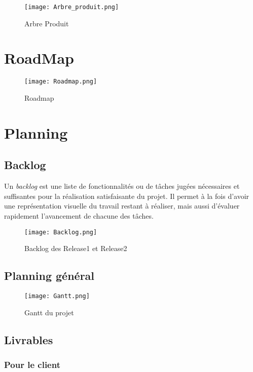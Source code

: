 \documentclass[10pt,a4paper]{article}
\begin{document}
\begin{figure}[!h]
  \centering
  \noindent\centerline{\texttt{[image: Arbre\_produit.png]}}
  \caption{Arbre Produit}
\end{figure}

\newpage
\section{RoadMap}

\begin{figure}[!h]
  \noindent\centerline{\texttt{[image: Roadmap.png]}}
  \caption{Roadmap}
\end{figure}

\newpage
\section{Planning}
\label{sec:planning}

\subsection{Backlog}

Un \textit{backlog} est une liste de fonctionnalités ou de tâches jugées nécessaires et suffisantes pour la réalisation satisfaisante du projet.
Il permet à la fois d'avoir une représentation visuelle du travail restant à réaliser, mais aussi d'évaluer rapidement l'avancement de chacune des tâches.

\begin{figure}[!h]
  \centering
\noindent\centerline{\texttt{[image: Backlog.png]}}
  \caption{Backlog des Release1 et Release2}
\end{figure}

\subsection{Planning général}

\begin{figure}[!h]
  \centering
\noindent\centerline{\texttt{[image: Gantt.png]}}
  \caption{Gantt du projet}
\end{figure}


\subsection{Livrables}

\subsubsection{Pour le client}
\end{document}
